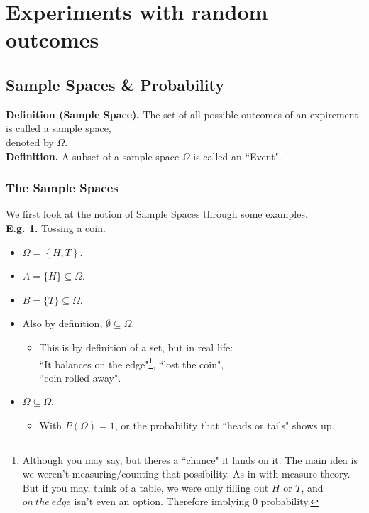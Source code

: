 \documentclass[12pt]{book}
\begin{document}
\chapter{Experiments with random outcomes}
\section{Sample Spaces \& Probability}
\textbf{Definition (Sample Space). }  The set of all possible outcomes of an expirement is called a sample space, \\denoted by $\Omega$.\\

\noindent \textbf{Definition. } A subset of a sample space $\Omega$ is called an ``Event". 

\subsection{The Sample Spaces}
We first look at the notion of Sample Spaces through some examples.\\
\textbf{E.g. 1. } Tossing a coin.
\begin{itemize}
\item$\Omega=\left\{ H,T \right\}$.
\item$A=\{H\}\subseteq \Omega$.
\item$B=\{T\}\subseteq \Omega$.
\item Also by definition, $\emptyset \subseteq \Omega$.
\begin{itemize}
\item This is by definition of a set, but in real life:\\``It balances on the edge"\footnote{Although you may say, but theres a ``chance" it lands on it. The main idea is we weren't measuring/counting that possibility. As in with measure theory. But if you may, think of a table, we were only filling out $H$ or $T$, and $on~the~edge$ isn't even an option. Therefore implying 0 probability.}, ``lost the coin", \\``coin rolled away".
\end{itemize}
\item $\Omega \subseteq \Omega$.
\begin{itemize}
\item With $P(\Omega)=1$, or the probability that ``heads or tails" shows up. 
\end{itemize}
\end{itemize}
\end{document}
